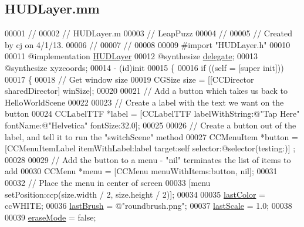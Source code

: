 \hypertarget{_h_u_d_layer_8mm}{\subsection{H\-U\-D\-Layer.\-mm}
\label{d2/d44/_h_u_d_layer_8mm}
}

\begin{DoxyCode}
00001 \textcolor{comment}{//}
00002 \textcolor{comment}{//  HUDLayer.m}
00003 \textcolor{comment}{//  LeapPuzz}
00004 \textcolor{comment}{//}
00005 \textcolor{comment}{//  Created by cj on 4/1/13.}
00006 \textcolor{comment}{//}
00007 \textcolor{comment}{//}
00008 
00009 \textcolor{preprocessor}{#import "HUDLayer.h"}
00010 
00011 \textcolor{keyword}{@implementation }\hyperlink{interface_h_u_d_layer}{HUDLayer}
00012 \textcolor{keyword}{@synthesize} \hyperlink{interface_h_u_d_layer_a64cb26c1f8c5a76e8f392a02291c0cf6}{delegate};
00013 \textcolor{keyword}{@synthesize} xyzcoords;
00014 - (id)init
00015 \{
00016     \textcolor{keywordflow}{if} ((\textcolor{keyword}{self} = [super init]))
00017     \{
00018         \textcolor{comment}{// Get window size}
00019         CGSize size = [[CCDirector sharedDirector] winSize];
00020         
00021         \textcolor{comment}{// Add a button which takes us back to HelloWorldScene}
00022         
00023         \textcolor{comment}{// Create a label with the text we want on the button}
00024         CCLabelTTF *label = [CCLabelTTF labelWithString:@"Tap Here" fontName:@"Helvetica" fontSize:32.0];
00025         
00026         \textcolor{comment}{// Create a button out of the label, and tell it to run the "switchScene" method}
00027         CCMenuItem *button = [CCMenuItemLabel itemWithLabel:label target:self selector:@selector(testing:)]
      ;
00028         
00029         \textcolor{comment}{// Add the button to a menu - "nil" terminates the list of items to add}
00030         CCMenu *menu = [CCMenu menuWithItems:button, nil];
00031         
00032         \textcolor{comment}{// Place the menu in center of screen}
00033         [menu setPosition:ccp(size.width / 2, size.height / 2)];
00034         
00035         \hyperlink{interface_h_u_d_layer_a2d27bf64876ea6f0b2f0d1b9013c1cd7}{lastColor} = ccWHITE;
00036         \hyperlink{interface_h_u_d_layer_ad7cb8a30419241ee8d2f2813031191be}{lastBrush} = \textcolor{stringliteral}{@"roundbrush.png"};
00037         \hyperlink{interface_h_u_d_layer_aedd1d8d2b2d31e203c3242d09390b561}{lastScale} = 1.0;
00038         
00039         \hyperlink{interface_h_u_d_layer_aa1df984387a5f884acf38a7d733d6432}{eraseMode} = \textcolor{keyword}{false};

\end{DoxyCode}
